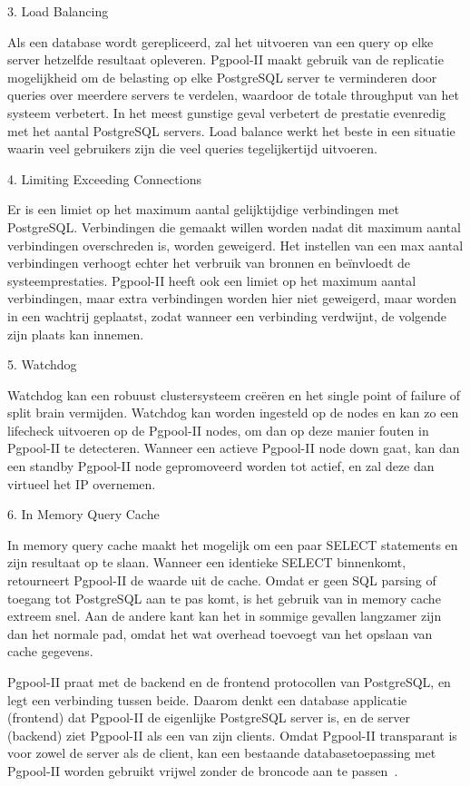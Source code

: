 3. Load Balancing

Als een database wordt gerepliceerd, zal het uitvoeren van een query op elke server hetzelfde resultaat opleveren. Pgpool-II maakt gebruik van de replicatie mogelijkheid om de belasting op elke PostgreSQL server te verminderen door queries over meerdere servers te verdelen, waardoor de totale throughput van het systeem verbetert. In het meest gunstige geval verbetert de prestatie evenredig met het aantal PostgreSQL servers. Load balance werkt het beste in een situatie waarin veel gebruikers zijn die veel queries tegelijkertijd uitvoeren.

4. Limiting Exceeding Connections

Er is een limiet op het maximum aantal gelijktijdige verbindingen met PostgreSQL. Verbindingen die gemaakt willen worden nadat dit maximum aantal verbindingen overschreden is, worden geweigerd. Het instellen van een max aantal verbindingen verhoogt echter het verbruik van bronnen en beïnvloedt de systeemprestaties. Pgpool-II heeft ook een limiet op het maximum aantal verbindingen, maar extra verbindingen worden hier niet geweigerd, maar worden in een wachtrij geplaatst, zodat wanneer een verbinding verdwijnt, de volgende zijn plaats kan innemen.

5. Watchdog

Watchdog kan een robuust clustersysteem creëren en het single point of failure of split brain vermijden. Watchdog kan worden ingesteld op de nodes en kan zo een lifecheck uitvoeren op de Pgpool-II nodes, om dan op deze manier fouten in Pgpool-II te detecteren. Wanneer een actieve Pgpool-II node down gaat, kan dan een standby Pgpool-II node gepromoveerd worden tot actief, en zal deze dan virtueel het IP overnemen. 

6. In Memory Query Cache

In memory query cache maakt het mogelijk om een paar SELECT statements en zijn resultaat op te slaan. Wanneer een identieke SELECT binnenkomt, retourneert Pgpool-II de waarde uit de cache. Omdat er geen SQL parsing of toegang tot PostgreSQL aan te pas komt, is het gebruik van in memory cache extreem snel. Aan de andere kant kan het in sommige gevallen langzamer zijn dan het normale pad, omdat het wat overhead toevoegt van het opslaan van cache gegevens.

Pgpool-II praat met de backend en de frontend protocollen van PostgreSQL, en legt een verbinding tussen beide. Daarom denkt een database applicatie (frontend) dat Pgpool-II de eigenlijke PostgreSQL server is, en de server (backend) ziet Pgpool-II als een van zijn clients. Omdat Pgpool-II transparant is voor zowel de server als de client, kan een bestaande databasetoepassing met Pgpool-II worden gebruikt vrijwel zonder de broncode aan te passen~\autocite{2021}. %


